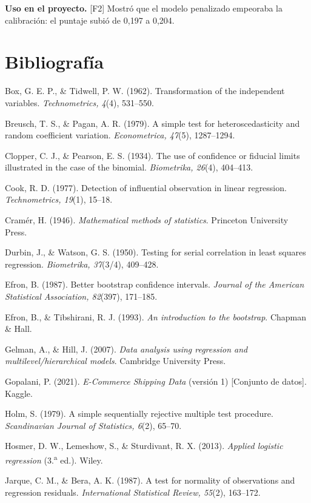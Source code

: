 \documentclass[11pt,a4paper]{article}
\newcommand{\uso}{\textbf{Uso en el proyecto.} }
\newcommand{\fase}[1]{{\footnotesize\color{gris}[#1]}}
\begin{document}
\uso \fase{F2} Mostró que el modelo penalizado empeoraba la calibración: el puntaje subió de 0,197 a 0,204.

\section*{Bibliografía}
{\footnotesize\setlength{\parindent}{-1.5em}\setlength{\leftskip}{1.5em}\setlength{\parskip}{0.2em}
Box, G. E. P., \& Tidwell, P. W. (1962). Transformation of the independent variables. \emph{Technometrics, 4}(4), 531--550.

Breusch, T. S., \& Pagan, A. R. (1979). A simple test for heteroscedasticity and random coefficient variation. \emph{Econometrica, 47}(5), 1287--1294.

Clopper, C. J., \& Pearson, E. S. (1934). The use of confidence or fiducial limits illustrated in the case of the binomial. \emph{Biometrika, 26}(4), 404--413.

Cook, R. D. (1977). Detection of influential observation in linear regression. \emph{Technometrics, 19}(1), 15--18.

Cramér, H. (1946). \emph{Mathematical methods of statistics}. Princeton University Press.

Durbin, J., \& Watson, G. S. (1950). Testing for serial correlation in least squares regression. \emph{Biometrika, 37}(3/4), 409--428.

Efron, B. (1987). Better bootstrap confidence intervals. \emph{Journal of the American Statistical Association, 82}(397), 171--185.

Efron, B., \& Tibshirani, R. J. (1993). \emph{An introduction to the bootstrap}. Chapman \& Hall.

Gelman, A., \& Hill, J. (2007). \emph{Data analysis using regression and multilevel/hierarchical models}. Cambridge University Press.

Gopalani, P. (2021). \emph{E-Commerce Shipping Data} (versión 1) [Conjunto de datos]. Kaggle.

Holm, S. (1979). A simple sequentially rejective multiple test procedure. \emph{Scandinavian Journal of Statistics, 6}(2), 65--70.

Hosmer, D. W., Lemeshow, S., \& Sturdivant, R. X. (2013). \emph{Applied logistic regression} (3.\textsuperscript{a} ed.). Wiley.

Jarque, C. M., \& Bera, A. K. (1987). A test for normality of observations and regression residuals. \emph{International Statistical Review, 55}(2), 163--172.

}
\end{document}
